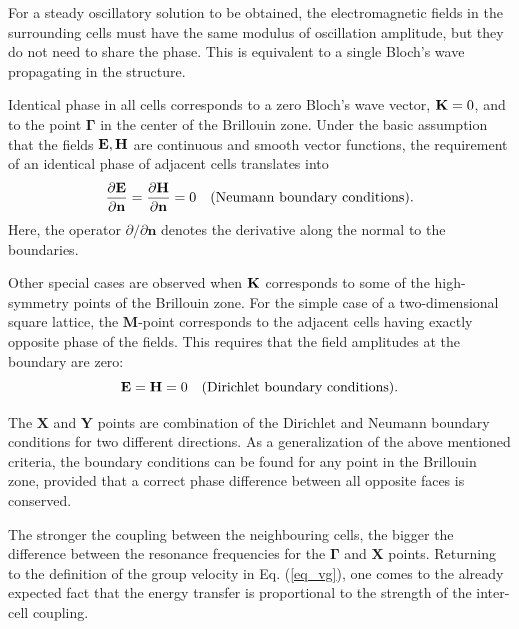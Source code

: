 For a steady oscillatory solution to be obtained, the electromagnetic fields in the surrounding cells must have the same modulus of oscillation amplitude, but they do not need to share the phase. This is equivalent to a single Bloch's wave propagating in the structure. 

Identical phase in all cells corresponds to a zero Bloch's wave vector, ${\mathbf{K}} = 0$, and to the point $\mathbf{\Gamma}$ in the center of the Brillouin zone. Under the basic assumption that the fields $\mathbf{E}, \mathbf{H}$ are continuous and smooth vector functions, the requirement of an identical phase of adjacent cells translates into
\begin{equation} \frac{\partial \mathbf{E}}{\partial\mathbf{n}} = \frac{\partial \mathbf{H}}{\partial\mathbf{n}} = 0 \quad\text{(Neumann boundary conditions).} \label{eq_bcond_neumann}\end{equation} 
Here, the operator $\partial/\partial \mathbf{n}$ denotes the derivative along the normal to the boundaries.

Other special cases are observed when ${\mathbf{K}}$ corresponds to some of the high-symmetry points of the Brillouin zone. For the simple case of a two-dimensional square lattice, the $\mathbf{M}$-point corresponds to the adjacent cells having exactly opposite phase of the fields. This requires that the field amplitudes at the boundary are zero:
\begin{equation} \mathbf{E} = \mathbf{H} = 0 \quad\text{(Dirichlet boundary conditions).} \label{eq_bcond_dirichlet}\end{equation} 

The $\mathbf{X}$ and $\mathbf{Y}$ points are combination of the Dirichlet and Neumann boundary conditions for two different directions.
As a generalization of the above mentioned criteria, the boundary conditions can be found for any point in the Brillouin zone, provided that a correct phase difference between all opposite faces is conserved.

The stronger the coupling between the neighbouring cells, the bigger the difference between the resonance frequencies for the $\mathbf{\Gamma}$ and $\mathbf{X}$ points. Returning to the definition of the group velocity in Eq. (\ref{eq_vg}), one comes to the already expected fact that the energy transfer is proportional to the strength of the inter-cell coupling.


